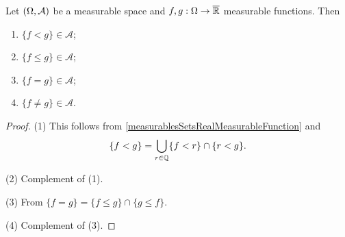 \begin{proposition} \label{measurablesSetsTwoRealMeasurableFunctions}
Let $\left( \Omega, \mathcal{A} \right)$ be a measurable space and $f,g: \Omega \to \overline{\mathbb{R}}$ measurable functions. Then
\begin{enumerate}
\item $\{f < g\} \in \mathcal{A}$;
\item $\{f \leq g\} \in \mathcal{A}$;
\item $\{f = g\} \in \mathcal{A}$;
\item $\{f \neq g\} \in \mathcal{A}$.
\end{enumerate}
\end{proposition}
\begin{proof}
(1) This follows from \ref{measurablesSetsRealMeasurableFunction} and
\[ \{f < g \} = \bigcup_{r\in\mathbb{Q}}\{f<r\}\cap \{r < g\}. \]

(2) Complement of (1).

(3) From $\{f = g\} = \{f \leq g\}\cap \{g \leq f\}$.

(4) Complement of (3).
\end{proof}

